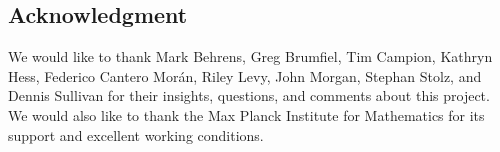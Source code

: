 
\subsection*{Acknowledgment}

We would like to thank Mark Behrens, Greg Brumfiel, Tim Campion, Kathryn Hess, Federico Cantero Mor\'an, Riley Levy, John Morgan, Stephan Stolz, and Dennis Sullivan for their insights, questions, and comments about this project.
We would also like to thank the Max Planck Institute for Mathematics for its support and excellent working conditions.